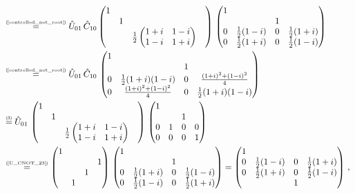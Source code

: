\documentclass[11pt]{article}
\numberwithin{equation}{section} %
\numberwithin{figure}{section} %
\newcommand\numeq[1] %
  {\stackrel{\scriptscriptstyle(\mkern-1.5mu#1\mkern-1.5mu)}{=}}
\begin{document}
\begin{appendices}
\begin{equation}
\begin{split}
&	\numeq{\textrm{\ref{controlled_not_root}}} \hat{U}_{01}\,\hat{C}_{10}\begin{pmatrix}1&&&\\ &1&&\\ &&\frac{1}{2}\begin{pmatrix} 1+i & 1-i \\ 1-i & 1+i
\end{pmatrix}\end{pmatrix}\,\begin{pmatrix}1&&&\\ &&1&\\ 0&\frac{1}{2}(1-i)&0&\frac{1}{2}(1+i)\\0&\frac{1}{2}(1+i)&0&\frac{1}{2}(1-i)\end{pmatrix}\\
&	\numeq{\textrm{\ref{controlled_not_root}}} \hat{U}_{01}\,\hat{C}_{10}\,\begin{pmatrix}1&&&\\ &&1&\\0&\frac{1}{2}(1+i)(1-i)&0&\frac{(1+i)^2+(1-i)^2}{4}\\0&\frac{(1+i)^2+(1-i)^2}{4}&0&\frac{1}{2}(1+i)(1-i)\end{pmatrix}\\
&	\numeq{3}\hat{U}_{01}\,\begin{pmatrix}1&&&\\ &1&&\\ &&\frac{1}{2}\begin{pmatrix} 1+i & 1-i \\ 1-i & 1+i
\end{pmatrix}\end{pmatrix}\,\begin{pmatrix}1&&&\\ &&1&\\0&1&0&0\\0&0&0&1\end{pmatrix}\\
&	\numeq{\textrm{\ref{U_CNOT_23}}} \begin{pmatrix} 1&&&\\ &&&1\\ &&1&\\ &1&&\end{pmatrix}\,\begin{pmatrix}1&&&\\ &&1&\\ 0&\frac{1}{2}(1+i)&0&\frac{1}{2}(1-i)\\0&\frac{1}{2}(1-i)&0&\frac{1}{2}(1+i)\end{pmatrix} = \begin{pmatrix}1&&&\\0&\frac{1}{2}(1-i)&0&\frac{1}{2}(1+i)\\0&\frac{1}{2}(1+i)&0&\frac{1}{2}(1-i)\\&&1&\end{pmatrix}\,,

\end{split}
\end{equation}
\end{appendices}
\end{document}
